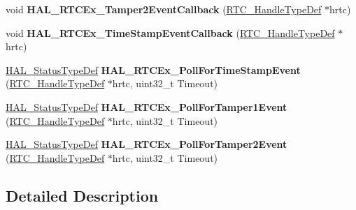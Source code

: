 \begin{DoxyCompactItemize}
\item 
void {\bfseries H\+A\+L\+\_\+\+R\+T\+C\+Ex\+\_\+\+Tamper2\+Event\+Callback} (\hyperlink{struct_r_t_c___handle_type_def}{R\+T\+C\+\_\+\+Handle\+Type\+Def} $\ast$hrtc)\hypertarget{group___r_t_c_ex___exported___functions___group1_ga14086326964355aaf3793ad3157ea7c3}{}\label{group___r_t_c_ex___exported___functions___group1_ga14086326964355aaf3793ad3157ea7c3}

\item 
void {\bfseries H\+A\+L\+\_\+\+R\+T\+C\+Ex\+\_\+\+Time\+Stamp\+Event\+Callback} (\hyperlink{struct_r_t_c___handle_type_def}{R\+T\+C\+\_\+\+Handle\+Type\+Def} $\ast$hrtc)\hypertarget{group___r_t_c_ex___exported___functions___group1_gac9ef67f1f1698e9560a5ecd5e8c9a330}{}\label{group___r_t_c_ex___exported___functions___group1_gac9ef67f1f1698e9560a5ecd5e8c9a330}

\item 
\hyperlink{stm32f4xx__hal__def_8h_a63c0679d1cb8b8c684fbb0632743478f}{H\+A\+L\+\_\+\+Status\+Type\+Def} {\bfseries H\+A\+L\+\_\+\+R\+T\+C\+Ex\+\_\+\+Poll\+For\+Time\+Stamp\+Event} (\hyperlink{struct_r_t_c___handle_type_def}{R\+T\+C\+\_\+\+Handle\+Type\+Def} $\ast$hrtc, uint32\+\_\+t Timeout)\hypertarget{group___r_t_c_ex___exported___functions___group1_gaff8adc3d27b9c84c69b64ffa6ad43457}{}\label{group___r_t_c_ex___exported___functions___group1_gaff8adc3d27b9c84c69b64ffa6ad43457}

\item 
\hyperlink{stm32f4xx__hal__def_8h_a63c0679d1cb8b8c684fbb0632743478f}{H\+A\+L\+\_\+\+Status\+Type\+Def} {\bfseries H\+A\+L\+\_\+\+R\+T\+C\+Ex\+\_\+\+Poll\+For\+Tamper1\+Event} (\hyperlink{struct_r_t_c___handle_type_def}{R\+T\+C\+\_\+\+Handle\+Type\+Def} $\ast$hrtc, uint32\+\_\+t Timeout)\hypertarget{group___r_t_c_ex___exported___functions___group1_gadea47894c36fc74044106654c081070b}{}\label{group___r_t_c_ex___exported___functions___group1_gadea47894c36fc74044106654c081070b}

\item 
\hyperlink{stm32f4xx__hal__def_8h_a63c0679d1cb8b8c684fbb0632743478f}{H\+A\+L\+\_\+\+Status\+Type\+Def} {\bfseries H\+A\+L\+\_\+\+R\+T\+C\+Ex\+\_\+\+Poll\+For\+Tamper2\+Event} (\hyperlink{struct_r_t_c___handle_type_def}{R\+T\+C\+\_\+\+Handle\+Type\+Def} $\ast$hrtc, uint32\+\_\+t Timeout)\hypertarget{group___r_t_c_ex___exported___functions___group1_ga974cfcdcbc9a6fc70effcf1c701ba535}{}\label{group___r_t_c_ex___exported___functions___group1_ga974cfcdcbc9a6fc70effcf1c701ba535}

\end{DoxyCompactItemize}


\subsection{Detailed Description}
